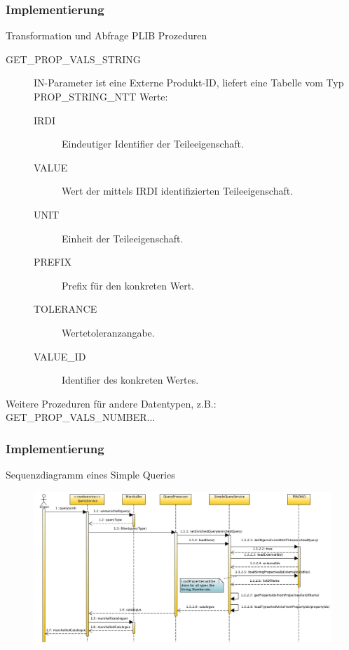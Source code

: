 \documentclass[serif,mathserif]{beamer}
\begin{document}
\begin{frame}
  \frametitle{Implementierung}
 Transformation und Abfrage PLIB Prozeduren
\begin{description}
\item[GET\_PROP\_VALS\_STRING] IN-Parameter ist eine Externe Produkt-ID, liefert eine Tabelle vom Typ PROP\_STRING\_NTT 
Werte: 
  \begin{description}
  \item[IRDI] Eindeutiger Identifier der Teileeigenschaft.
  \item[VALUE] Wert der mittels IRDI identifizierten Teileeigenschaft.
  \item[UNIT] Einheit der Teileeigenschaft.
  \item[PREFIX] Prefix für den konkreten Wert.
  \item[TOLERANCE] Wertetoleranzangabe.
  \item[VALUE\_ID] Identifier des konkreten Wertes.
  \end{description}

  \end{description}
  
  Weitere Prozeduren für andere Datentypen, z.B.: GET\_PROP\_VALS\_NUMBER...
  \end{frame}

\begin{frame}
  \frametitle{Implementierung}
  Sequenzdiagramm eines Simple Queries
    \begin{figure}[t]
    \includegraphics[width=11.5cm]{images/plib_simple_query_sequence_diagram.jpg}

  \end{figure}
\end{frame}
\end{document}
